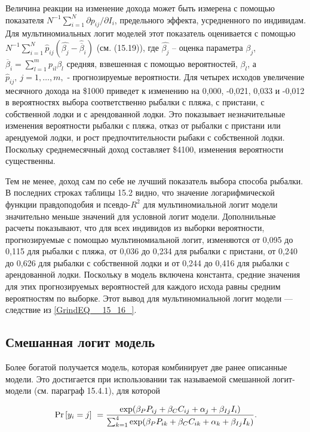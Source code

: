 Величина реакции на изменение дохода может быть измерена с помощью показателя $N^{-1}\sum^N_{i=1}{{\partial p_{ij}}/{\partial I_i}}$, предельного эффекта, усредненного по индивидам. Для мультиномиальных логит моделей этот показатель оценивается с помощью $N^{-1}\sum^N_{i=1}{{\hat{p}}_{ij}(\widehat{{\beta }_j}-{\widehat{\overline{\beta }}}_i)}$ (см. (15.19)), где $\widehat{{\beta }_j}$ -- оценка параметра ${\beta }_j$, ${\overline{\beta }}_i=\sum^m_{l=1}{p_{il}{\beta }_l}$ средняя, взвешенная с помощью вероятностей, ${\beta }_l$, а ${\hat{p}}_{ij},\ j=1,\dots ,m,$ - прогнозируемые вероятности. Для четырех исходов увеличение месячного дохода на \$1000 приведет к изменению на 0,000, -0,021, 0,033 и -0,012 в вероятностях выбора соответственно рыбалки с пляжа, с пристани, с собственной лодки и с арендованной лодки. Это показывает незначительные изменения вероятности рыбалки с пляжа, отказ от рыбалки с пристани или арендуемой лодки, и рост предпочтительности рыбаки с собственной лодки. Поскольку среднемесячный доход составляет \$4100, изменения вероятности существенны.

Тем не менее, доход сам по себе не лучший показатель выбора способа рыбалки. В последних строках таблицы 15.2 видно, что значение логарифмической функции правдоподобия и псевдо-$R^2$ для мультиномиальной логит модели значительно меньше значений для условной логит модели. Дополнильные расчеты показывают, что для всех индивидов из выборки вероятности, прогнозируемые с помощью мультиномиальной логит, изменяются от 0,095 до 0,115 для рыбалки с пляжа, от 0,036 до 0,234 для рыбалки с пристани, от 0,240 до 0,626 для рыбалки с собственной лодки и от 0,244 до 0,416 для рыбалки с арендованной лодки. Поскольку в модель включена константа, средние значения для этих прогнозируемых вероятностей для каждого исхода равны средним вероятностям по выборке. Этот вывод для мультиномиальной логит модели --- следствие из \eqref{GrindEQ__15_16_}.

\subsection{Смешанная логит модель}

Более богатой получается модель, которая комбинирует две ранее описанные модели. Это  достигается при использовании так называемой смешанной логит-модели (см. параграф 15.4.1), для которой

\[{\Pr  \left[y_i=j\right]\ }=
\frac{{\rm exp}({\beta }_PP_{ij}+{\beta }_CC_{ij}+{\alpha }_j+{\beta }_{Ij}I_i)}
{\sum^4_{k=1}{{\rm exp}({\beta }_PP_{ik}+{\beta }_CC_{ik}+{\alpha }_k+{\beta }_{Ij}I_k)}}.\] 


